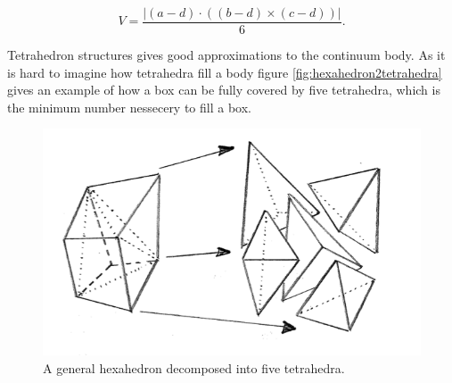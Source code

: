 \begin{equation}
    V = \frac {|(a-d) \cdot ((b-d) \times (c-d))|}{6}. 
\end{equation}





Tetrahedron structures gives good approximations to the continuum
body. As it is hard to imagine how tetrahedra fill a body
figure \vref{fig:hexahedron2tetrahedra} gives an example of how a
box can be fully covered by five tetrahedra, which is the minimum
number nessecery to fill a box.

\begin{figure}
  \centering
  \includegraphics[width=12cm]{./images/finite_element_method_hexahedron2tetrahedra.png}
\caption{A general hexahedron decomposed into five tetrahedra.}
\label{fig:hexahedron2tetrahedra}
\end{figure}

